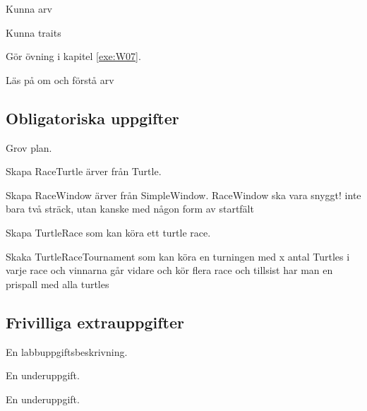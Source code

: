 

\Lab{\LabWeekSEVEN}

\begin{Goals}
\item Kunna arv
\item Kunna traits
\end{Goals}

\begin{Preparations}
\item Gör övning {\tt \ExeWeekSEVEN} i kapitel \ref{exe:W07}.
\item Läs på om och förstå arv
\end{Preparations}

\subsection{Obligatoriska uppgifter}

\Task Grov plan.

\Subtask Skapa RaceTurtle ärver från Turtle.

\Subtask Skapa RaceWindow ärver från SimpleWindow. RaceWindow ska vara snyggt!
inte bara två sträck, utan kanske med någon form av startfält

\Subtask Skapa TurtleRace som kan köra ett turtle race.

\Subtask Skaka TurtleRaceTournament som kan köra en turningen med x antal
Turtles i varje race och vinnarna går vidare och kör flera race och tillsist har
man en prispall med alla turtles

\subsection{Frivilliga extrauppgifter}

\Task En labbuppgiftsbeskrivning.

\Subtask En underuppgift.

\Subtask En underuppgift.
